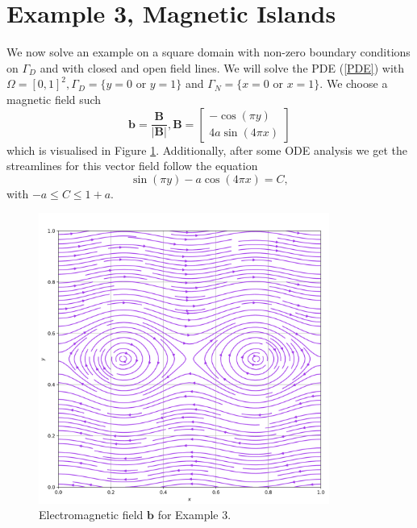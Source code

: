 \documentclass[12pt]{ociamthesis}
\begin{document}
\section{Example 3, Magnetic Islands}
We now solve an example on a square domain with non-zero boundary conditions on $\Gamma_D$ and with closed and open field lines. We will solve the PDE (\ref{PDE}) with $\Omega = [0,1]^2, \Gamma_D = \{y=0 \text{ or } y=1\}$ and $\Gamma_N = \{x=0 \text{ or } x=1\}$. We choose a magnetic field such 
\begin{equation}
\mathbf{b} = \frac{\mathbf{B}}{|\mathbf{B}|}, 
\mathbf{B} = \left[ \begin{matrix}
-\cos(\pi y)\\
4a \sin(4 \pi x)
\end{matrix} \right]
\end{equation}
which is visualised in Figure \ref{E3_VF}. Additionally, after some ODE analysis we get the streamlines for this vector field follow the equation
\begin{equation}
\sin(\pi y)-a\cos(4\pi x) = C,
\end{equation}
with $-a\leq C \leq 1+a$.
\begin{figure}[H]
\begin{center}
 \includegraphics[width=0.85\textwidth]{Pics/VectorField/E3b.png}
  \caption{Electromagnetic field $\mathbf{b}$ for Example $3$.}
 \label{E3_VF}
\end{center}
\end{figure}
\end{document}
